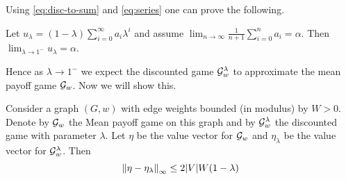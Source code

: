 Using \eqref{eq:disc-to-sum} and \eqref{eq:series} one can prove the following.
\begin{theorem}
    Let $u_\lambda=(1-\lambda) \sum_{i=0}^\infty a_i \lambda^i$ and assume $\lim_{n \to \infty} \frac{1}{n+1}\sum_{i=0}^n a_i = \alpha$. Then $\lim_{\lambda \to 1^-} u_\lambda = \alpha$.
\end{theorem}

Hence as $\lambda \to 1^-$ we expect the discounted game $\mathcal{G}^\lambda_w$ to approximate the mean payoff game $\mathcal{G}_w$. Now we will show this.

\begin{theorem}
    \label{thm:mean-to-discounted}
    Consider a graph $(G,w)$ with edge weights bounded (in modulus) by $W > 0$. Denote by $\mathcal{G}_w$ the Mean payoff game on this graph and by $\mathcal{G}^\lambda_w$ the discounted game with parameter $\lambda$. Let $\eta$ be the value vector for $\mathcal{G}_w$ and $\eta_\lambda$ be the value vector for $\mathcal{G}^\lambda_w$. Then
    \[
        \left\lVert\eta - \eta_{\lambda}\right\rVert_\infty \leq 2|V|W (1-\lambda)
    \]
\end{theorem}
